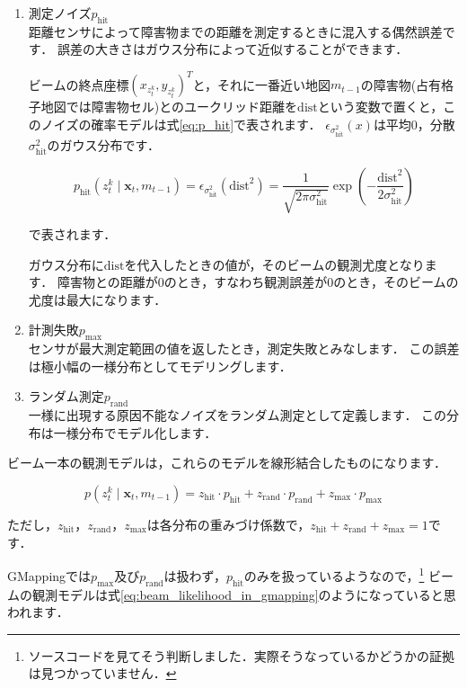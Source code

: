 \documentclass[{../../master}]{subfiles}
\begin{document}
\begin{enumerate}
  \item 測定ノイズ$p_{\text{hit}}$ \\
  距離センサによって障害物までの距離を測定するときに混入する偶然誤差です．
  誤差の大きさはガウス分布によって近似することができます．
  
  ビームの終点座標$(x_{z_{t}^k}, y_{z_{t}^k})^T$と，それに一番近い地図$m_{t-1}$の障害物(占有格子地図では障害物セル)とのユークリッド距離を$\text{dist}$という変数で置くと，このノイズの確率モデルは式\ref{eq:p_hit}で表されます．
  $\epsilon_{\sigma_{\text{hit}}^{2}}(x)$は平均0，分散$\sigma_{\text{hit}}^2$のガウス分布です．
  
  \begin{equation}
    p_{\text{hit}}(z_{t}^{k} \mid \bm{x}_{t}, m_{t-1}) = \epsilon_{\sigma_{\text{hit}}^{2}}(\text{dist}^2) = \frac{1}{\sqrt{2\pi \sigma_{\text{hit}}^2}} \exp\left(-\frac{\text{dist}^2}{2\sigma_{\text{hit}}^2}\right)
    \label{eq:p_hit}
  \end{equation}
  
  \noindent
  で表されます．
  
  ガウス分布に$\text{dist}$を代入したときの値が，そのビームの観測尤度となります．
  障害物との距離が0のとき，すなわち観測誤差が0のとき，そのビームの尤度は最大になります．
  \item 計測失敗$p_{\text{max}}$ \\
  センサが最大測定範囲の値を返したとき，測定失敗とみなします．
  この誤差は極小幅の一様分布としてモデリングします．
  \item ランダム測定$p_{\text{rand}}$ \\
  一様に出現する原因不能なノイズをランダム測定として定義します．
  この分布は一様分布でモデル化します．
\end{enumerate}

ビーム一本の観測モデルは，これらのモデルを線形結合したものになります．

\begin{equation}
  p(z_{t}^{k} \mid \bm{x}_{t}, m_{t-1}) = z_{\text{hit}} \cdot p_{\text{hit}} + z_{\text{rand}} \cdot p_{\text{rand}} + z_{\text{max}} \cdot p_{\text{max}}
  \label{eq:beam_likelihood}
\end{equation}

ただし，$z_{\text{hit}}$，$z_{\text{rand}}$，$z_{\text{max}}$は各分布の重みづけ係数で，$z_{\text{hit}} + z_{\text{rand}} + z_{\text{max}} = 1$です．

GMappingでは$p_{\text{max}}$及び$p_{\text{rand}}$は扱わず，$p_{\text{hit}}$のみを扱っているようなので，\footnote{ソースコードを見てそう判断しました．実際そうなっているかどうかの証拠は見つかっていません．}
ビームの観測モデルは式\ref{eq:beam_likelihood_in_gmapping}のようになっていると思われます．
\end{document}
